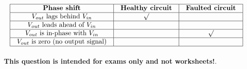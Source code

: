 $$\vbox{\offinterlineskip
\halign{\strut
\vrule \quad\hfil # \ \hfil & 
\vrule \quad\hfil # \ \hfil & 
\vrule \quad\hfil # \ \hfil \vrule \cr
\noalign{\hrule}
%
{\bf Phase shift} & {\bf Healthy circuit} & {\bf Faulted circuit} \cr
%
\noalign{\hrule}
%
$V_{out}$ lags behind $V_{in}$ & $\surd$ &  \cr
%
\noalign{\hrule}
%
$V_{out}$ leads ahead of $V_{in}$ &  &  \cr
%
\noalign{\hrule}
%
$V_{out}$ is in-phase with $V_{in}$ &  & $\surd$ \cr
%
\noalign{\hrule}
%
$V_{out}$ is zero (no output signal) &  &  \cr
%
\noalign{\hrule}
} %
}$$ %








{\bf This question is intended for exams only and not worksheets!}.



